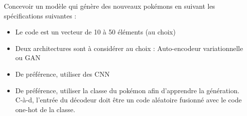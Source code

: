 \documentclass[11pt, a4paper]{article}
\begin{document}
Concevoir un modèle qui génère des nouveaux pokémons en suivant les spécifications suivantes : 
\begin{itemize}
	\item Le code est un vecteur de 10 à 50 éléments (au choix)
	\item Deux architectures sont à considérer au choix : Auto-encodeur variationnelle ou GAN
	\item De préférence, utiliser des CNN
	\item De préférence, utiliser la classe du pokémon afin d'apprendre la génération. C-à-d, l'entrée du décodeur doit être un code aléatoire fusionné avec le code one-hot de la classe.
\end{itemize}
\end{document}
